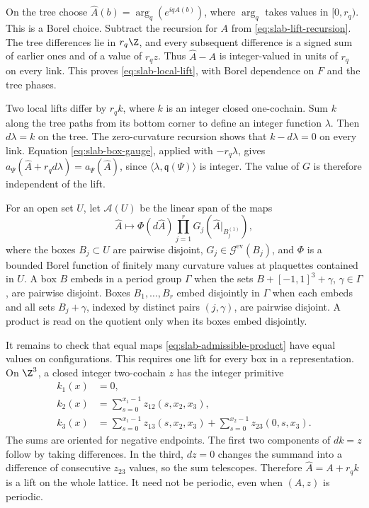 On the tree choose $\widehat A(b)=\arg_q(e^{iqA(b)})$, where
$\arg_q$ takes values in $[0,r_q)$. This is a Borel choice. Subtract
the recursion for $A$ from \eqref{eq:slab-lift-recursion}. The tree
differences lie in $r_q\Z$, and every subsequent difference is a signed
sum of earlier ones and of a value of $r_qz$. Thus
$\widehat A-A$ is integer-valued in units of $r_q$ on every link. This
proves \eqref{eq:slab-local-lift}, with Borel dependence on $F$ and the
tree phases.

Two local lifts differ by $r_qk$, where $k$ is an integer closed
one-cochain. Sum $k$ along the tree paths from its bottom corner to
define an integer function $\lambda$. Then $d\lambda=k$ on the tree.
The zero-curvature recursion shows that $k-d\lambda=0$ on every link.
Equation \eqref{eq:slab-box-gauge}, applied with $-r_q\lambda$, gives
$a_\Psi(\widehat A+r_qd\lambda)=a_\Psi(\widehat A)$, since
$\langle\lambda,\mathfrak q(\Psi)\rangle$ is integer. The value of $G$
is therefore independent of the lift.

For an open set $U$, let $\mathcal A(U)$ be the linear span of the maps
\begin{equation}\label{eq:slab-admissible-product}
 \widehat A\longmapsto\Phi(d\widehat A)
                   \prod_{j=1}^rG_j(\widehat A|_{B_j^{(1)}}),
\end{equation}
where the boxes $B_j\subset U$ are pairwise disjoint,
$G_j\in\mathcal G^{\mathrm{ev}}(B_j)$, and $\Phi$ is a bounded Borel
function of finitely many curvature values at plaquettes contained in
$U$. A box $B$ embeds in a period group $\Gamma$ when the sets
$B+[-1,1]^3+\gamma$, $\gamma\in\Gamma$, are pairwise disjoint.
Boxes $B_1,\ldots,B_r$ embed disjointly in $\Gamma$ when each
embeds and all sets $B_j+\gamma$, indexed by distinct pairs
$(j,\gamma)$, are pairwise disjoint. A product is read on the
quotient only when its boxes embed disjointly.

It remains to check that equal maps \eqref{eq:slab-admissible-product}
have equal values on configurations. This requires one lift for every
box in a representation. On $\Z^3$, a closed integer two-cochain $z$
has the integer primitive
\begin{align*}
 k_1(x)&=0,\\
 k_2(x)&=\sum_{s=0}^{x_1-1}z_{12}(s,x_2,x_3),\\
 k_3(x)&=\sum_{s=0}^{x_1-1}z_{13}(s,x_2,x_3)
                    +\sum_{s=0}^{x_2-1}z_{23}(0,s,x_3).
\end{align*}
The sums are oriented for negative endpoints. The first two components
of $dk=z$ follow by taking differences. In the third, $dz=0$ changes
the summand into a difference of consecutive $z_{23}$ values, so the
sum telescopes. Therefore $\widehat A=A+r_qk$ is a lift on the whole
lattice. It need not be periodic, even when $(A,z)$ is periodic.


